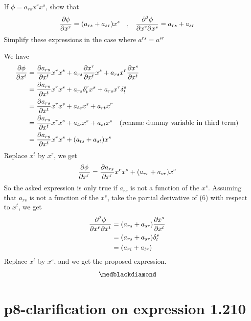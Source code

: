 \begin{tcolorbox}
If $\phi = a_{rs}x^rx^s$, show that
$$\pdv{\phi}{x^{r}} = (a_{rs}+a_{sr})x^s \quad\text{,}\quad\pdv{\phi}{x^{r}}{x^{s}} = a_{rs}+a_{sr}$$
Simplify these expressions in the case where $a^{rs} = a^{sr}$
\end{tcolorbox}
We have 
\begin{align} 
\pdv{\phi}{x^{t}} &= \pdv{a_{rs}}{x^{t}}x^{r}x^{s}+a_{rs}\pdv{x^{r}}{x^{t}}x^{s}+a_{rs}x^{r}\pdv{x^{s}}{x^{t}}\\
&= \pdv{a_{rs}}{x^{t}}x^{r}x^{s}+a_{rs}\delta_t^rx^{s}+a_{rs}x^{r}\delta^s_t\\
&= \pdv{a_{rs}}{x^{t}}x^{r}x^{s}+a_{ts}x^{s}+a_{rt}x^{r}\\
&= \pdv{a_{rs}}{x^{t}}x^{r}x^{s}+a_{ts}x^{s}+a_{st}x^{s}\quad\text{(rename dummy variable in third term)}\\
&= \pdv{a_{rs}}{x^{t}}x^{r}x^{s}+(a_{ts}+a_{st})x^{s}
\end{align}
Replace $x^t$ by $x^r$, we get
\begin{align}
\pdv{\phi}{x^{r}}  =\pdv{a_{rs}}{x^{r}}x^{r}x^{s}+(a_{rs}+a_{sr})x^{s}
\end{align}
So the asked expression is only true if $a_{rs}$ is not a function of the $x^{s}$.
Assuming that $a_{rs}$ is not a function of the $x^{s}$, take the partial derivative of (6) with respect to $x^{t}$, we get
\begin{align} 
\pdv{\phi}{x^{r}}{x^{t}} &= (a_{rs}+a_{sr})\pdv{x^{s}}{x^{t}}\\
&=(a_{rs}+a_{sr})\delta^{s}_{t}\\
&=(a_{rt}+a_{tr})
\end{align}
Replace $x^t$ by $x^s$, and we get the proposed expression.
$$\medblackdiamond$$
\pagebreak[4]

\section{p8-clarification on expression 1.210}

